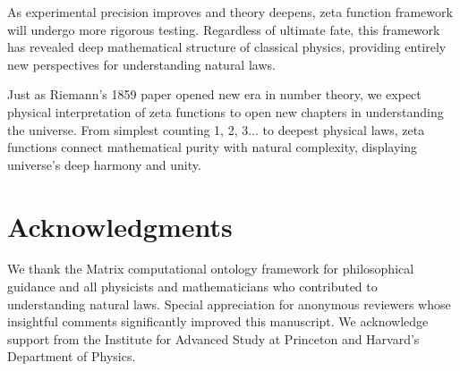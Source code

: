 \documentclass[12pt,a4paper]{article}
\begin{document}
As experimental precision improves and theory deepens, zeta function framework will undergo more rigorous testing. Regardless of ultimate fate, this framework has revealed deep mathematical structure of classical physics, providing entirely new perspectives for understanding natural laws.

Just as Riemann's 1859 paper opened new era in number theory, we expect physical interpretation of zeta functions to open new chapters in understanding the universe. From simplest counting 1, 2, 3... to deepest physical laws, zeta functions connect mathematical purity with natural complexity, displaying universe's deep harmony and unity.

\section*{Acknowledgments}

We thank the Matrix computational ontology framework for philosophical guidance and all physicists and mathematicians who contributed to understanding natural laws. Special appreciation for anonymous reviewers whose insightful comments significantly improved this manuscript. We acknowledge support from the Institute for Advanced Study at Princeton and Harvard's Department of Physics.
\end{document}
